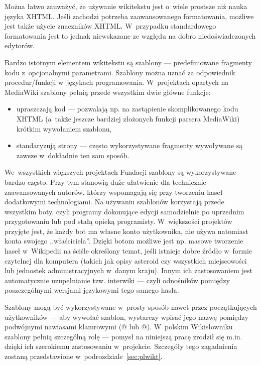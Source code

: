 Można łatwo zauważyć, że używanie wikitekstu jest o~wiele prostsze niż nauka języka XHTML. Jeśli zachodzi potrzeba zaawansowanego formatowania, możliwe jest także użycie znaczników XHTML. W~przypadku standardowego formatowania jest to jednak niewskazane ze względu na dobro niedoświadczonych edytorów.

Bardzo istotnym elementem wikitekstu są szablony --- predefiniowane fragmenty kodu z~opcjonalnymi parametrami. Szablony można uznać za odpowiednik procedur/funkcji w~językach programowania. W~projektach opartych na MediaWiki szablony pełnią przede wszystkim dwie główne funkcje:
\begin{itemize}
	\item upraszczają kod --- pozwalają np. na zastąpienie skomplikowanego kodu XHTML (a~także jeszcze bardziej złożonych funkcji parsera MediaWiki) krótkim wywołaniem szablonu,
	\item standaryzują strony --- często wykorzystywane fragmenty wywoływane są zawsze w~dokładnie ten sam sposób.
\end{itemize}
We~wszystkich większych projektach Fundacji szablony są wykorzystywane bardzo często. Przy tym stanowią duże ułatwienie dla technicznie zaawansowanych autorów, którzy wspomagają się przy tworzeniu haseł dodatkowymi technologiami. Na używaniu szablonów korzystają przede wszystkim boty, czyli programy dokonujące edycji samodzielnie po uprzednim przygotowaniu lub pod stałą opieką programisty. W~większości projektów przyjęte jest, że każdy bot ma własne konto użytkownika, nie używa natomiast konta swojego ,,właściciela''. Dzięki botom możliwe jest np. masowe tworzenie haseł w~Wikipedii na ściśle określony temat, jeśli istnieje dobre źródło w~formie czytelnej dla komputera (takich jak opisy asteroid czy wszystkich miejscowości lub jednostek administracyjnych w~danym kraju). Innym ich zastosowaniem jest automatycznie uzupełnianie tzw. interwiki --- czyli odnośników pomiędzy poszczególnymi wersjami językowymi tego samego hasła.

Szablony mogą być wykorzystywane w~prosty sposób nawet przez początkujących użytkowników --- aby wywołać szablon, wystarczy wpisać jego nazwę
 pomiędzy podwójnymi nawiasami klamrowymi (@ lub @). W~polskim Wikisłowniku szablony pełnią szczególną rolę --- pomysł na niniejszą pracę zrodził się m.in. dzięki ich szerokiemu zastosowaniu w~projekcie. Szczegóły tego zagadnienia zostaną przedstawione w~podrozdziale~\ref{sec:plwikt}.

